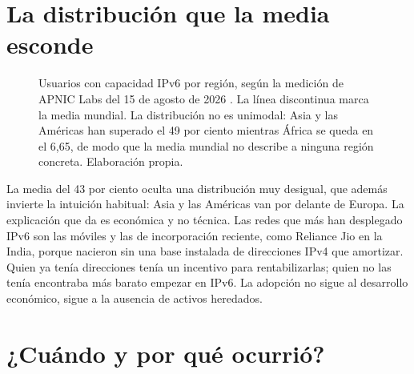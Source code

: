 \documentclass[11pt,letterpaper]{article}
\begin{document}
\section{La distribución que la media esconde}

\begin{figure}[ht]
  \centering
  \caption{Usuarios con capacidad IPv6 por región, según la medición de APNIC
  Labs del 15 de agosto de 2026 \parencite{apnicv6}. La línea discontinua marca
  la media mundial. La distribución no es unimodal: Asia y las Américas han
  superado el 49 por ciento mientras África se queda en el 6,65, de modo que la
  media mundial no describe a ninguna región concreta. Elaboración propia.}
  \label{fig:regiones}
\end{figure}

La media del 43 por ciento oculta una distribución muy desigual, que además
invierte la intuición habitual: Asia y las Américas van por delante de Europa. La
explicación que da \textcite{huston2026b} es económica y no técnica. Las redes que
más han desplegado IPv6 son las móviles y las de incorporación reciente, como
Reliance Jio en la India, porque nacieron sin una base instalada de direcciones
IPv4 que amortizar. Quien ya tenía direcciones tenía un incentivo para
rentabilizarlas; quien no las tenía encontraba más barato empezar en IPv6. La
adopción no sigue al desarrollo económico, sigue a la ausencia de activos
heredados.

\section{¿Cuándo y por qué ocurrió?}
\end{document}
